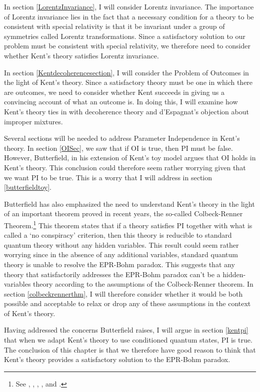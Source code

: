 In section \ref{LorentzInvariance}, I will consider Lorentz invariance. The importance of Lorentz invariance lies in the fact that a necessary condition for a theory to be consistent with special relativity is that it be invariant under a group of symmetries called Lorentz transformations. Since a satisfactory solution to our problem must be consistent with special relativity, we therefore need to consider whether Kent's theory satisfies Lorentz invariance. 

In section \ref{Kentdecoherencesection}, I will consider the Problem of Outcomes in the light of Kent's theory. Since a satisfactory theory must be one in which there are outcomes, we need to consider whether Kent succeeds in giving us a convincing account of what an outcome is. In doing this, I will examine how Kent's theory ties in with decoherence theory and d'Espagnat's objection about improper mixtures. 

Several sections will be needed to address Parameter Independence in Kent's theory. In section \ref{OISec}, we saw that if OI is true, then PI must be false. However, Butterfield, in his extension of Kent's toy model argues that OI holds in Kent's theory. This  conclusion could therefore seem rather worrying given that we want PI to be true. This is a worry that I will address in section  \ref{butterfieldtoy}.

Butterfield has also emphasized the need to understand Kent's theory in the light of an important theorem proved in recent years, the so-called Colbeck-Renner Theorem.\footnote{See \cite{LeegwaterGijs2016Aitf}, \cite{ColbeckRoger2011Neoq}, \cite{ColbeckRoger2012Tcoq}, \cite{LandsmanK2015OtCt}, and \cite{Landsman}.} This theorem states that if a theory satisfies PI together with what is called a `no conspiracy' criterion, then this theory is reducible to standard quantum theory without any hidden variables. This result could seem rather worrying since in the absence of any additional variables, standard quantum theory is unable to resolve the EPR-Bohm paradox. This  suggests that any theory that satisfactorily addresses the  EPR-Bohm paradox can't be a hidden-variables theory according to the assumptions of the Colbeck-Renner theorem. In section \ref{colbeckrennerthm}, I will therefore consider whether it would be both possible and acceptable to relax or drop any of these assumptions in the context of Kent's theory.

Having addressed the concerns Butterfield raises,  I will argue in section \ref{kentpi} that when we adapt Kent's theory to use conditioned quantum states, PI is true. The conclusion of this chapter is that we therefore have good reason to think that Kent's theory provides a satisfactory solution to the EPR-Bohm paradox. 

